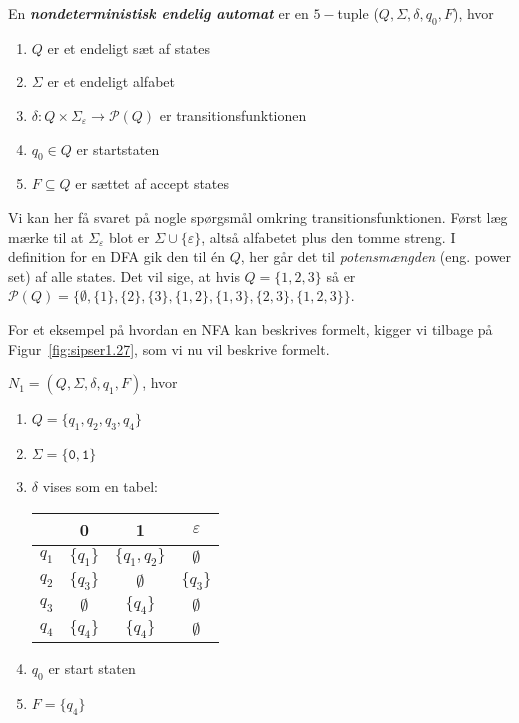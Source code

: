 \begin{definition}
  \label{def:nfa}
  En \textbf{\textit{nondeterministisk endelig automat}} er en $5-$tuple ($Q, \Sigma, \delta, q_{0}, F$), hvor
  \begin{enumerate}
    \item $Q$ er et endeligt sæt af states
    \item $\Sigma$ er et endeligt alfabet
    \item $\delta : Q \times \Sigma_{\varepsilon} \rightarrow \mathcal{P}(Q)$ er transitionsfunktionen
    \item $q_{0} \in Q$ er startstaten
    \item $F \subseteq Q$ er sættet af accept states
  \end{enumerate}
\end{definition}

Vi kan her få svaret på nogle spørgsmål omkring transitionsfunktionen. Først læg mærke til at $\Sigma_{\varepsilon}$ blot er $\Sigma \cup \{\varepsilon\}$, altså alfabetet plus den tomme streng. I definition for en DFA gik den til én $Q$, her går det til \textit{potensmængden} (eng. power set) af alle states. Det vil sige, at hvis $Q = \{{1}, {2}, {3}\}$ så er $\mathcal{P}(Q) = \{\emptyset, \{1\}, \{2\}, \{3\}, \{1, 2\}, \{1, 3\}, \{2, 3\}, \{1,2,3\}\}$.

For et eksempel på hvordan en NFA kan beskrives formelt, kigger vi tilbage på Figur~\ref{fig:sipser1.27}, som vi nu vil beskrive formelt.

$N_{1} = (Q, \Sigma, \delta, q_{1}, F)$, hvor

\begin{enumerate}
  \item $Q = \{q_{1}, q_{2}, q_{3}, q_4\}$
  \item $\Sigma = \{\mathtt{0,1}\}$
  \item $\delta$ vises som en tabel:\\
        \begin{center}

        \begin{tabular}{c|ccc}
  & 0 & 1 & $\varepsilon$ \\ \hline
$q_1$ & $\{q_1\}$ & $\{q_1, q_2\}$ & $\emptyset$ \\
$q_2$ & $\{q_3\}$ & $\emptyset$ & $\{q_3\}$ \\
$q_3$ & $\emptyset$ & $\{q_4\}$ & $\emptyset$ \\
$q_4$ & $\{q_4\}$ & $\{q_4\}$ & $\emptyset$ \\
\end{tabular}
\end{center}
  \item $q_{0}$ er start staten
        \item $F = \{q_{4}\}$
\end{enumerate}

